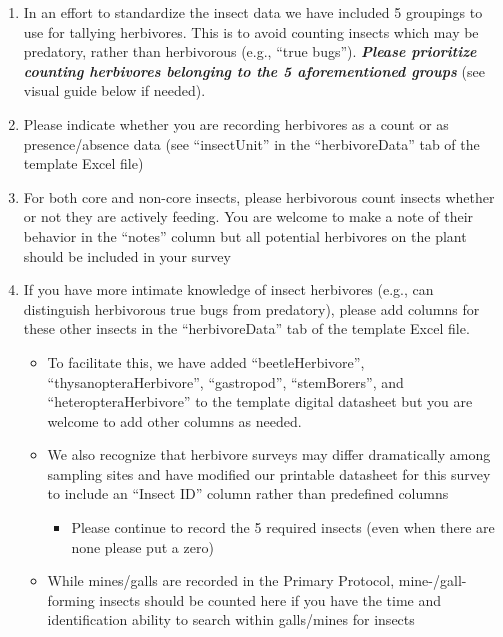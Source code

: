 \documentclass[
  letterpaper,
  DIV=11,
  numbers=noendperiod]{scrreprt}
\providecommand{\tightlist}{%
  \setlength{\itemsep}{0pt}\setlength{\parskip}{0pt}}\usepackage{longtable,booktabs,array}
\begin{document}
\begin{enumerate}
\def\labelenumi{\arabic{enumi}.}
\item
  In an effort to standardize the insect data we have included 5
  groupings to use for tallying herbivores. This is to avoid counting
  insects which may be predatory, rather than herbivorous (e.g., ``true
  bugs''). \textbf{\emph{Please prioritize counting herbivores belonging
  to the 5 aforementioned groups}} (see visual guide below if needed).
\item
  Please indicate whether you are recording herbivores as a count or as
  presence/absence data (see ``insectUnit'' in the ``herbivoreData'' tab
  of the template Excel file)
\item
  For both core and non-core insects, please herbivorous count insects
  whether or not they are actively feeding. You are welcome to make a
  note of their behavior in the ``notes'' column but all potential
  herbivores on the plant should be included in your survey
\item
  If you have more intimate knowledge of insect herbivores (e.g., can
  distinguish herbivorous true bugs from predatory), please add columns
  for these other insects in the ``herbivoreData'' tab of the template
  Excel file.

  \begin{itemize}
  \item
    To facilitate this, we have added ``beetleHerbivore'',
    ``thysanopteraHerbivore'', ``gastropod'', ``stemBorers'', and
    ``heteropteraHerbivore'' to the template digital datasheet but you
    are welcome to add other columns as needed.
  \item
    We also recognize that herbivore surveys may differ dramatically
    among sampling sites and have modified our printable datasheet for
    this survey to include an ``Insect ID'' column rather than
    predefined columns

    \begin{itemize}
    \tightlist
    \item
      Please continue to record the 5 required insects (even when there
      are none please put a zero)
    \end{itemize}
  \item
    While mines/galls are recorded in the Primary Protocol,
    mine-/gall-forming insects should be counted here if you have the
    time and identification ability to search within galls/mines for
    insects
  \end{itemize}
\end{enumerate}
\end{document}
